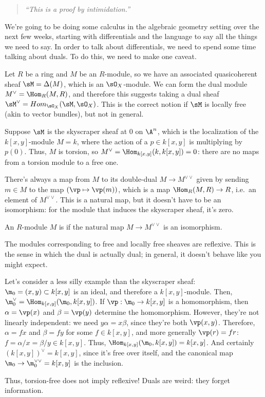 \begin{quote}\textit{
	``This is a proof by intimidation.''
}\end{quote}
We're going to be doing some calculus in the algebraic geometry setting over the next few weeks, starting with
differentials and the language to say all the things we need to say. In order to talk about differentials, we need
to spend some time talking about duals. To do this, we need to make one caveat.

Let \(R\) be a ring and \(M\) be an \(R\)-module, so we have an associated quasicoherent sheaf \(\sM = \Delta(M)\),
which is an \(\sO_X\)-module. We can form the dual module \(M^\vee = \Hom_R(M,R)\), and therefore this suggests
taking a dual sheaf \(\sM^\vee = \shom_{\sO_X}(\sM,\sO_X)\). This is the correct notion if \(\sM\) is locally free
(akin to vector bundles), but not in general.

Suppose \(\sM\) is the skyscraper sheaf at \(0\) on \(\A^n\), which is the localization of the \(k[x,y]\)-module
\(M = k\), where the action of a \(p\in k[x,y]\) is multiplying by \(p(0)\). Thus, \(M\) is torsion, so \(M^\vee =
\Hom_{k[x,y]}(k,k[x,y]) = 0\): there are no maps from a torsion module to a free one.

There's always a map from \(M\) to its double-dual \(M\to M^{\vee\vee}\) given by sending \(m\in M\) to the map
\((\vp\mapsto\vp(m))\), which is a map \(\Hom_R(M,R)\to R\), i.e.\ an element of \(M^{\vee\vee}\). This is a
natural map, but it doesn't have to be an isomorphism: for the module that induces the skyscraper sheaf, it's zero.
\begin{defn}
An \(R\)-module \(M\) is  if the natural map \(M\to M^{\vee\vee}\) is an isomorphism.
\end{defn}
The modules corresponding to free and locally free sheaves are reflexive. This is the sense in which the dual is
actually dual; in general, it doesn't behave like you might expect.
\begin{exm}
Let's consider a less silly example than the skyscraper sheaf: \(\m_0 = (x,y)\subset k[x,y]\) is an ideal, and
therefore a \(k[x,y]\)-module. Then, \(\m_0^\vee = \Hom_{k[x,y]}(\m_0,k[x,y])\). If \(\vp:\m_0\to k[x,y]\) is a
homomorphism, then \(\alpha = \vp(x)\) and \(\beta = \vp(y)\) determine the homomorphism. However, they're not
linearly independent: we need \(y\alpha = x\beta\), since they're both \(\vp(x,y)\). Therefore, \(\alpha = fx\) and
\(\beta = fy\) for some \(f\in k[x,y]\), and more generally \(\vp(r) = fr\): \(f = \alpha/x = \beta/y\in k[x,y]\).
Thus, \(\Hom_{k[x,y]}(\m_0,k[x,y]) = k[x,y]\). And certainly \((k[x,y])^\vee = k[x,y]\), since it's free over
itself, and the canonical map \(\m_0\to\m_0^{\vee\vee} = k[x,y]\) is the inclusion.
\end{exm}
Thus, torsion-free does not imply reflexive! Duals are weird: they forget information.

